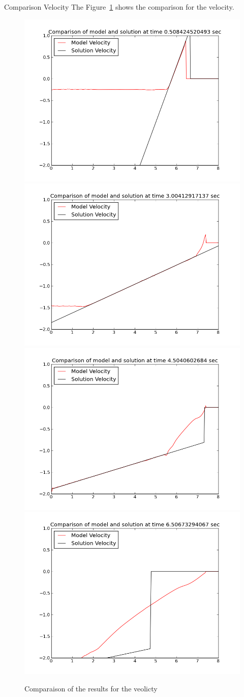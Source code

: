 Comparison Velocity
The Figure~\ref{fig:swash:res_vel} shows the comparison for the velocity.
\begin{figure}
\centering
\includegraphics[width=.5\textwidth]{img/res_vel_t0_5.png}
\includegraphics[width=.5\textwidth]{img/res_vel_t3_0.png}
\includegraphics[width=.5\textwidth]{img/res_vel_t4_5.png}
\includegraphics[width=.5\textwidth]{img/res_vel_t6_5.png}
\caption{Comparaison of the results for the veolicty}\label{fig:swash:res_vel}
\end{figure}
